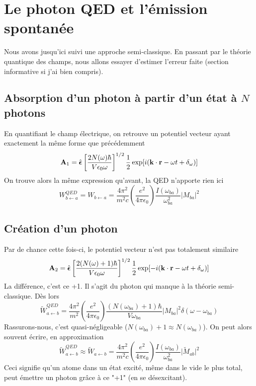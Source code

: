 \section{Le photon QED et l'émission spontanée}
Nous avons jusqu'ici suivi une approche semi-classique. En passant par le théorie quantique des 
champs, nous allons essayer d'estimer l'erreur faite (section informative si j'ai bien compris). 

\subsection{Absorption d'un photon à partir d'un état à $N$ photons}
En quantifiant le champ électrique, on retrouve un potentiel vecteur ayant exactement la même forme
que précédemment
\begin{equation}
  {\bf A}_1 = 
  \hat{  \mbox{\boldmath $ \epsilon $}}
\left[  \frac{2 N(\omega) \hbar}{ V \epsilon_0 \omega}
  \right] ^{1/2} \frac{1}{2}
  \exp [ i ( {\bf k} \cdot {\bf r} - \omega t 
+ \delta_{\omega} )  ] 
\end{equation}
On trouve alors la même expression qu'avant, la QED n'apporte rien ici
\begin{equation}
W_{b \leftarrow a} ^{QED} = 
W_{b \leftarrow a} 
= \frac{4 \pi ^2}{m^2 c} \left( \frac{e^2}{4 \pi \epsilon_0 } \right)
\frac{I( \omega_{ba}) }{\omega_{ba}^2 } \vert M_{ba} \vert ^2
\end{equation}


\subsection{Création d'un photon}
Par de chance cette fois-ci, le potentiel vecteur n'est pas totalement similaire
\begin{equation}
  {\bf A}_2 = 
  \hat{  \mbox{\boldmath $ \epsilon $}}
\left[ \frac{ 2(  N(\omega)+1) \hbar}{ V \epsilon_0 \omega}
  \right] ^{1/2} \frac{1}{2}
   \exp [ -i ( {\bf k} \cdot {\bf r} 
- \omega t + \delta_{\omega} ) ]
\end{equation}
La différence, c'est ce +1. Il s'agit du photon qui manque à la théorie semi-classique. Dès lors
\begin{equation}
\tilde{W}_{a \leftarrow b}^{QED} =
 \frac{4 \pi ^2}{m^2 } \left( \frac{e^2}{4 \pi \epsilon_0 } \right)
\frac{( N (\omega_{ba}) + 1) \hbar }{V \omega_{ba} } \vert M_{ba} \vert ^2
  \delta(\omega - \omega_{ba} )
\end{equation}
Rassurons-nous, c'est quasi-négligeable ($ N (\omega_{ba}) + 1 \approx N (\omega_{ba})$). On peut
alors souvent écrire, en approximation
\begin{equation}
\tilde{W}_{a \leftarrow b}^{QED} \approx
\tilde{W}_{a \leftarrow b} =  
\frac{4 \pi ^2}{m^2 c} \left( \frac{e^2}{4 \pi \epsilon_0 } \right)
\frac{I( \omega_{ba}) }{\omega_{ba}^2 } \vert \tilde{M}_{ab} \vert ^2
\end{equation}
Ceci signifie qu'un atome dans un état excité, même dans le vide le plus total, peut émettre un
photon grâce à ce "+1" (en se désexcitant).\\

